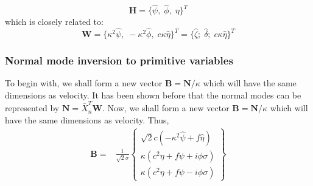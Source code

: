 $$\mathbf{H} = \{\hat \psi,\; \hat \phi,\;  \eta  \}^T$$
which is closely related to:
$$\mathbf{W} 
= \{\kappa^2\hat \psi,\; -\kappa^2\hat 
\phi,\; c\kappa\hat \eta  \}^T 
= \{\hat \zeta;\; \hat \delta;\;  c\kappa \hat \eta \}^T $$

\subsubsection{Normal mode inversion to primitive variables}
To begin with, we shall form a new vector $\mathbf{B} = \mathbf{N}/\kappa$ 
which will have the same dimensions as velocity.
It has been shown before that the normal modes can be represented by $\mathbf{N} 
= \bar{X}_n^T \mathbf{W}$. Now,  we shall form a new vector $\mathbf{B} = 
\mathbf{N}/\kappa$ which will have the same dimensions as velocity. Thus,
\begin{align}
   \mathbf{B}
   = &\frac{1}{\sqrt{2}\sigma}
    \begin{Bmatrix} \sqrt{2} c\left(- 
    \kappa^{2} \hat \psi +  f\hat\eta \right)\\
    \kappa \left(c^{2} \eta + f \psi + i \phi \sigma\right)\\
    \kappa \left(c^{2} \eta + f \psi - i \phi \sigma\right)
    \end{Bmatrix}
\end{align}

